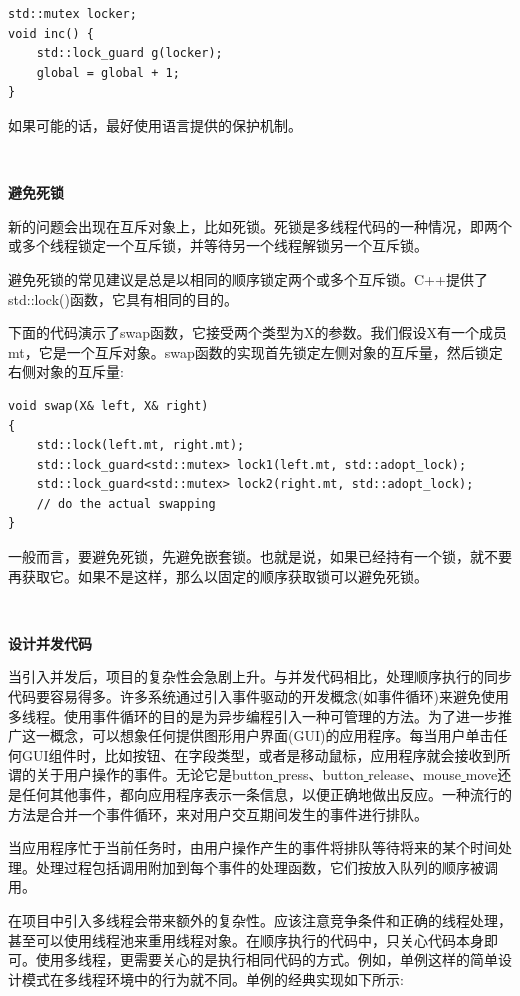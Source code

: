 \begin{lstlisting}[caption={}]
std::mutex locker;
void inc() {
	std::lock_guard g(locker);
	global = global + 1;
}
\end{lstlisting}

如果可能的话，最好使用语言提供的保护机制。 \par

\noindent\textbf{}\ \par
\textbf{避免死锁} \ \par
新的问题会出现在互斥对象上，比如死锁。死锁是多线程代码的一种情况，即两个或多个线程锁定一个互斥锁，并等待另一个线程解锁另一个互斥锁。 \par
避免死锁的常见建议是总是以相同的顺序锁定两个或多个互斥锁。C++提供了std::lock()函数，它具有相同的目的。 \par
下面的代码演示了swap函数，它接受两个类型为X的参数。我们假设X有一个成员mt，它是一个互斥对象。swap函数的实现首先锁定左侧对象的互斥量，然后锁定右侧对象的互斥量: \par

\begin{lstlisting}[caption={}]
void swap(X& left, X& right)
{
	std::lock(left.mt, right.mt);
	std::lock_guard<std::mutex> lock1(left.mt, std::adopt_lock);
	std::lock_guard<std::mutex> lock2(right.mt, std::adopt_lock);
	// do the actual swapping
}
\end{lstlisting}

一般而言，要避免死锁，先避免嵌套锁。也就是说，如果已经持有一个锁，就不要再获取它。如果不是这样，那么以固定的顺序获取锁可以避免死锁。 \par

\noindent\textbf{}\ \par
\textbf{设计并发代码} \ \par
当引入并发后，项目的复杂性会急剧上升。与并发代码相比，处理顺序执行的同步代码要容易得多。许多系统通过引入事件驱动的开发概念(如事件循环)来避免使用多线程。使用事件循环的目的是为异步编程引入一种可管理的方法。为了进一步推广这一概念，可以想象任何提供图形用户界面(GUI)的应用程序。每当用户单击任何GUI组件时，比如按钮、在字段类型，或者是移动鼠标，应用程序就会接收到所谓的关于用户操作的事件。无论它是button\underline{ }press、button\underline{ }release、mouse\underline{ }move还是任何其他事件，都向应用程序表示一条信息，以便正确地做出反应。一种流行的方法是合并一个事件循环，来对用户交互期间发生的事件进行排队。 \par
当应用程序忙于当前任务时，由用户操作产生的事件将排队等待将来的某个时间处理。处理过程包括调用附加到每个事件的处理函数，它们按放入队列的顺序被调用。 \par
在项目中引入多线程会带来额外的复杂性。应该注意竞争条件和正确的线程处理，甚至可以使用线程池来重用线程对象。在顺序执行的代码中，只关心代码本身即可。使用多线程，更需要关心的是执行相同代码的方式。例如，单例这样的简单设计模式在多线程环境中的行为就不同。单例的经典实现如下所示: \par

